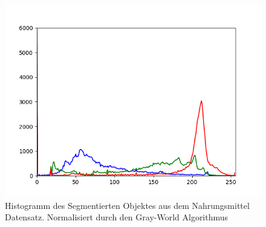 \documentclass[a4paper,12pt,oneside]{article}
\begin{document}
\begin{figure}[htb]
\begin{minipage}[c]{0.08\textwidth}
\end{minipage}
\hfill
\begin{minipage}[c]{0.3\textwidth}
\includegraphics[width=\textwidth]{Sources/Bild3_GW_histo.png}
\end{minipage}
\caption{Histogramm des Segmentierten Objektes aus dem Nahrungsmittel Datensatz. Normalisiert durch den Gray-World Algorithmus}
\label{img:evalGW}
\end{figure}
\newpage
\end{document}
